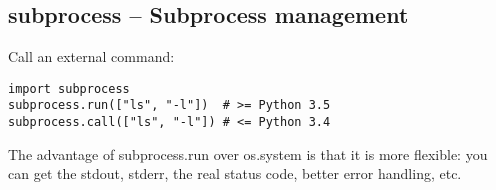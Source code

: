 \subsection{subprocess -- Subprocess management}
Call an external command:
\begin{verbatim}
import subprocess
subprocess.run(["ls", "-l"])  # >= Python 3.5
subprocess.call(["ls", "-l"]) # <= Python 3.4
\end{verbatim}

The advantage of subprocess.run over os.system is that it is more flexible: you can get the stdout, stderr, the real status code, better error handling, etc.

%
